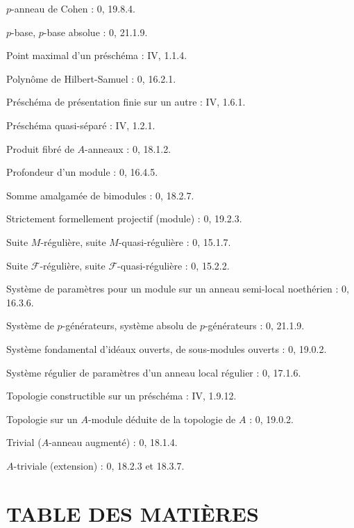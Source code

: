 \documentclass[10pt,oneside]{book}
\newcommand{\oldpage}[2][]{%
  \setcounter{footnote}{0}%
  \marginpar{\scriptsize\textbf{#1}~|~#2}\ignorespaces}
\begin{document}
$p$-anneau de Cohen : 0, 19.8.4.\par
$p$-base, $p$-base absolue : 0, 21.1.9.\par
Point maximal d'un préschéma : IV, 1.1.4.\par

\clearpage
\oldpage[IV-1]{256}
Polynôme de Hilbert-Samuel : 0, 16.2.1.\par
Préschéma de présentation finie sur un autre : IV, 1.6.1.\par
Préschéma quasi-séparé : IV, 1.2.1.\par
Produit fibré de $A$-anneaux : 0, 18.1.2.\par
Profondeur d'un module : 0, 16.4.5.\par

Somme amalgamée de bimodules : 0, 18.2.7.\par
Strictement formellement projectif (module) : 0, 19.2.3.\par
Suite $M$-régulière, suite $M$-quasi-régulière : 0, 15.1.7.\par
Suite $\mathscr F$-régulière, suite $\mathscr F$-quasi-régulière : 0, 15.2.2.\par
Système de paramètres pour un module sur un anneau semi-local noethérien : 0, 16.3.6.\par
Système de $p$-générateurs, système absolu de $p$-générateurs : 0, 21.1.9.\par
Système fondamental d'idéaux ouverts, de sous-modules ouverts : 0, 19.0.2.\par
Système régulier de paramètres d'un anneau local régulier : 0, 17.1.6.\par

Topologie constructible sur un préschéma : IV, 1.9.12.\par
Topologie sur un $A$-module déduite de la topologie de $A$ : 0, 19.0.2.\par
Trivial ($A$-anneau augmenté) : 0, 18.1.4.\par
$A$-triviale (extension) : 0, 18.2.3 et 18.3.7.\par

\clearpage
\oldpage[IV-1]{257}
{}
\section*{TABLE DES MATIÈRES}
\end{document}
